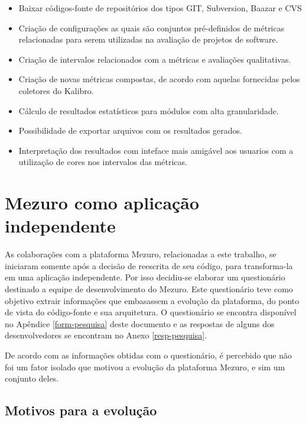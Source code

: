 \begin{itemize}
\item Baixar códigos-fonte de repositórios dos tipos GIT, Subversion, Baazar e CVS
\item Criação de configurações as quais são conjuntos pré-definidos de métricas relacionadas para serem utilizadas na avaliação de projetos de software.
\item Criação de intervalos relacionados com a métricas e avaliações qualitativas.
\item Criação de novas métricas compostas, de acordo com aquelas fornecidas pelos coletores do Kalibro.
\item Cálculo de resultados estatísticos para módulos com alta granularidade.
\item Possibilidade de exportar arquivos com os resultados gerados.
\item Interpretação dos resultados com inteface mais amigável aos usuarios com a utilização de cores nos intervalos das métricas.
\end{itemize}

\section{Mezuro como aplicação independente}

As colaborações com a plataforma Mezuro, relacionadas a este trabalho, se iniciaram somente após a decisão de reescrita de seu código, para transforma-la em uma aplicação independente. Por isso decidiu-se elaborar um questionário destinado a equipe de desenvolvimento do Mezuro. Este questionário teve como objetivo extrair informações que embasassem a evolução da plataforma, do ponto de vista do código-fonte e sua arquitetura. O questionário se encontra disponível no Apêndice \ref{form-pesquisa} deste documento e as respostas de alguns dos desenvolvedores se encontram no Anexo \ref{resp-pesquisa}.

De acordo com as informações obtidas com o questionário, é percebido que não foi um fator isolado que motivou a evolução da plataforma Mezuro, e sim um conjunto deles. 

\subsection{Motivos para a evolução}


